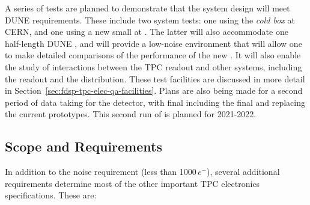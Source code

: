 A series of tests are planned to demonstrate that the  system design will meet DUNE requirements. These include two system tests: one using the  \textit{cold box} at CERN, and one using a new small \lartpc at \fnal. The latter will also accommodate one half-length DUNE , and will provide a low-noise environment that will allow one to make detailed comparisons of the performance of the new . It will also enable the study of interactions between the TPC readout and other systems, including the  readout and the  distribution. These test facilities are discussed in more detail in Section~\ref{sec:fdsp-tpc-elec-qa-facilities}. Plans are also being made for a second period of data taking for the  detector, with final  including the final  and  replacing the current prototypes. This second run of  is planned for 2021-2022.

\subsection{Scope and Requirements}
\label{sec:fdsp-tpcelec-overview-scope}


In addition to the noise requirement (less than \num{1000}\,$e^{-}$), several additional requirements determine most of the other important TPC electronics specifications.  These are:


